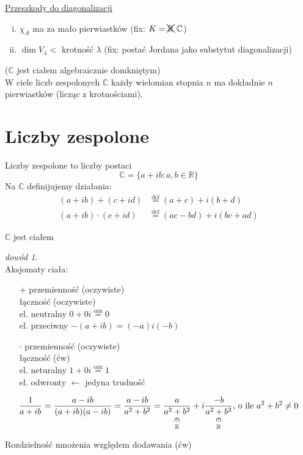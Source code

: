 \documentclass[10pt]{article}
\newcommand{\vertin}{\rotatebox{90}{$\ni$}}
\newcommand{\underscript}[3]{\underset{\scriptstyle{\overset{#2}{#3}}}{#1}}
\theoremstyle{definition}
\theoremstyle{definition}
\theoremstyle{definition}
\theoremstyle{definition}
\theoremstyle{remark}
\newtheorem*{dd}{dowód}
\theoremstyle{definition}
\theoremstyle{definition}
\theoremstyle{definition}
\theoremstyle{definition}
\theoremstyle{definition}
\begin{document}
 
\underline{Przeszkody do diagonalizacji}
\begin{enumerate}[(i)]
    \item $\chi _A$ ma za mało pierwiastków (fix:  $K = \xcancel{\mathbb{R}} \ \mathbb{C}$)
    \item $\dim V_\lambda < $ krotność $\lambda$ (fix: postać Jordana jako substytut diagonalizacji)
\end{enumerate}
\begin{tw} ($\mathbb{C}$ jest ciałem algebraicznie domkniętym) \\ 
    W ciele liczb zespolonych $\mathbb{C}$ każdy wielomian stopnia $n$ ma dokładnie $n$ pierwiastków
    (licząc z krotnościami). \end{tw} 
\section{Liczby zespolone} 
\begin{df} Liczby zespolone to liczby postaci 
    $$ \mathbb{C} = \{ a + ib : a,b \in \mathbb{R} \} $$ 
    Na $\mathbb{C}$ definijujemy działania: 
    \begin{align*}
        (a + ib) + (c+id) &\overset{\text{def}}{=} (a+c) + i(b+d) \\ 
        (a + ib) \cdot (c+id) &\overset{\text{def}}{=} (ac-bd) + i(bc+ad)
    \end{align*}
\end{df}
\begin{ft} $\mathbb{C}$ jest ciałem \end{ft} 
\begin{dd} ~\\ 
    Aksjomaty ciała:
    \begin{itemize} 
        \item[$+$] przemienność (oczywiste) \\ 
             łączność (oczywiste) \\ 
             el. neutralny $ 0 + 0i \overset{\text{ozn}}{=} 0$ \\ 
             el. przeciwny $-(a + ib) = (-a) i(-b)$
        \item[$\cdot$] przemienność (oczywiste) \\
             łączność (ćw) \\  
             el. neturalny $1 + 0i \overset{\text{ozn}}{=} 1$ \\ 
             el. odwronty $\leftarrow$ jedyna trudność
    \end{itemize} 
    \[ \frac{1}{a + ib} = \frac{a-ib}{(a+ib)(a-ib)} = \frac{a-ib}{a^2+b^2}=
    \underscript{\frac{a}{a^2+b^2}}{\vertin}{\mathbb{R}} + i \underscript{\frac{-b}{a^2+b^2}}{\vertin}{\mathbb{R}} 
    \text{, o ile } a^2 + b^2 \neq 0\]
    
    \item[] Rozdzielność mnożenia względem dodawania (ćw)
\end{dd} 
\end{document}
